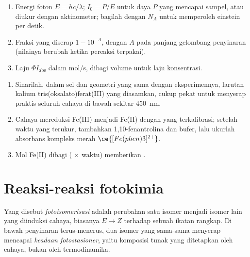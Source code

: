 \begin{method}\label{met:b3:photochemistry:photochemical-rate}
\begin{enumerate}
  \item Energi foton $E = hc/\lambda$;  $I_0 = P/E$ untuk daya $P$
        yang mencapai sampel, atau diukur dengan aktinometer; bagilah dengan
        $N_A$ untuk memperoleh einstein per detik.
  \item Fraksi yang diserap $1 - 10^{-A}$, dengan $A$ pada panjang gelombang
        penyinaran (nilainya berubah ketika pereaksi terpakai).
  \item Laju $\Phi I_{\mathrm{abs}}$ dalam mol/s, dibagi volume untuk laju
        konsentrasi.
\end{enumerate}
\end{method}

\begin{method}\label{met:b3:photochemistry:actinometry}
\begin{enumerate}
  \item Sinarilah, dalam sel dan geometri yang sama dengan eksperimennya,
        larutan kalium tris(oksalato)ferat(III) yang diasamkan, cukup pekat
        untuk menyerap praktis seluruh cahaya di bawah sekitar \qty{450}{nm}.
  \item Cahaya mereduksi Fe(III) menjadi Fe(II) dengan  yang
        terkalibrasi; setelah waktu yang terukur, tambahkan 1,10-fenantrolina
        dan bufer, lalu ukurlah absorbans kompleks merah $\ce{[Fe(phen)3]^{2+}}$.
  \item Mol Fe(II) dibagi ( $\times$ waktu) memberikan .
\end{enumerate}
\end{method}

\section{Reaksi-reaksi fotokimia}

\begin{definition}\label{def:b3:photochemistry:photoisomerisation}
Yang disebut \emph{fotoisomerisasi} adalah perubahan
satu isomer menjadi isomer lain yang diinduksi cahaya, biasanya $E \to Z$
terhadap sebuah ikatan rangkap. Di bawah penyinaran terus-menerus, dua isomer
yang sama-sama menyerap mencapai \emph{keadaan
fotostasioner}, yaitu komposisi tunak yang
ditetapkan oleh cahaya, bukan oleh termodinamika.
\end{definition}

